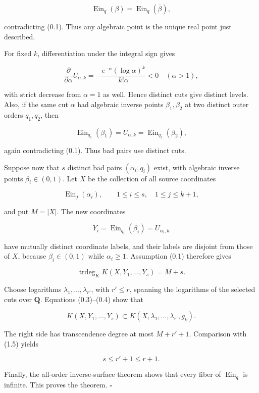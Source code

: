 \[
 \operatorname{Ein}_q(\beta)
 =\operatorname{Ein}_q(\overline\beta),
\]

contradicting (0.1). Thus any algebraic point is the unique real point just
described.

For fixed \(k\), differentiation under the integral sign gives

\[
 \frac{\partial}{\partial\alpha}U_{\alpha,k}
 =-\frac{e^{-\alpha}(\log\alpha)^k}{k!\alpha}<0
 \quad(\alpha>1),                                             \tag{GS-1.4}
\]

with strict decrease from \(\alpha=1\) as well. Hence distinct cuts give
distinct levels. Also, if the same cut \(\alpha\) had algebraic inverse
points \(\beta_1,\beta_2\) at two distinct outer orders \(q_1,q_2\), then

\[
 \operatorname{Ein}_{q_1}(\beta_1)
 =U_{\alpha,k}
 =\operatorname{Ein}_{q_2}(\beta_2),
\]

again contradicting (0.1). Thus bad pairs use distinct cuts.

Suppose now that \(s\) distinct bad pairs
\((\alpha_i,q_i)\) exist, with algebraic inverse points
\(\beta_i\in(0,1)\). Let \(X\) be the collection of all source coordinates

\[
 \operatorname{Ein}_j(\alpha_i),
 \qquad 1\leq i\leq s,\quad1\leq j\leq k+1,
\]

and put \(M=|X|\). The new coordinates

\[
 Y_i=\operatorname{Ein}_{q_i}(\beta_i)=U_{\alpha_i,k}
\]

have mutually distinct coordinate labels, and their labels are disjoint
from those of \(X\), because \(\beta_i\in(0,1)\) while
\(\alpha_i\geq1\). Assumption (0.1) therefore
gives

\[
 \operatorname{trdeg}_K K(X,Y_1,\ldots,Y_s)=M+s.              \tag{GS-1.5}
\]

Choose logarithms \(\lambda_1,\ldots,\lambda_{r'}\), with
\(r'\leq r\), spanning the logarithms of the selected cuts over
\(\mathbf Q\). Equations (0.3)--(0.4) show that

\[
 K(X,Y_1,\ldots,Y_s)
 \subset K(X,\lambda_1,\ldots,\lambda_{r'},g_k).
\]

The right side has transcendence degree at most \(M+r'+1\). Comparison
with (1.5) yields

\[
 s\leq r'+1\leq r+1.                                         \tag{GS-1.6}
\]

Finally, the all-order inverse-surface theorem shows that every fiber of
\(\operatorname{Ein}_q\) is infinite. This proves the theorem. \(\square\)


